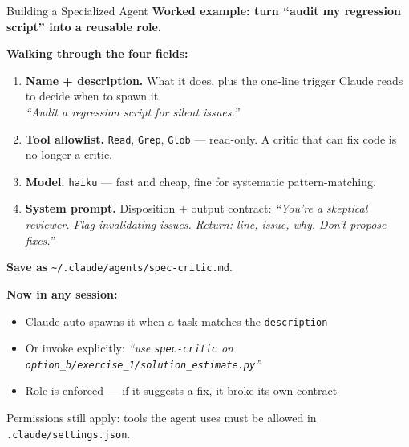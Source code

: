 \documentclass[aspectratio=169, 11pt]{beamer}
\begin{document}
\begin{frame}[fragile]{Building a Specialized Agent}
  \textbf{Worked example: turn ``audit my regression script'' into a reusable role.}

  \vspace{0.4em}
  \textbf{Walking through the four fields:}
  \begin{enumerate}\small
    \item \textbf{Name + description.} What it does, plus the one-line trigger Claude reads to decide when to spawn it.\\
    \emph{``Audit a regression script for silent issues.''}
    \item \textbf{Tool allowlist.} \texttt{Read}, \texttt{Grep}, \texttt{Glob} --- read-only. A critic that can fix code is no longer a critic.
    \item \textbf{Model.} \texttt{haiku} --- fast and cheap, fine for systematic pattern-matching.
    \item \textbf{System prompt.} Disposition + output contract: \emph{``You're a skeptical reviewer. Flag invalidating issues. Return: line, issue, why. Don't propose fixes.''}
  \end{enumerate}

  \vspace{0.3em}
  \textbf{Save as} \texttt{\textasciitilde/.claude/agents/spec-critic.md}.

  \vspace{0.3em}
  \textbf{Now in any session:}
  \begin{itemize}\small
    \item Claude auto-spawns it when a task matches the \texttt{description}
    \item Or invoke explicitly: \emph{``use \texttt{spec-critic} on \texttt{option\_b/exercise\_1/solution\_estimate.py}''}
    \item Role is enforced --- if it suggests a fix, it broke its own contract
  \end{itemize}

  \vspace{0.2em}
  \alert{\small Permissions still apply: tools the agent uses must be allowed in \texttt{.claude/settings.json}.}
\end{frame}
\end{document}
